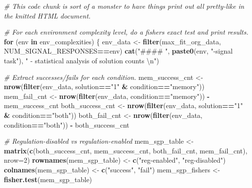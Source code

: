 \documentclass[
]{book}
\newenvironment{Shaded}{\begin{snugshade}}{\end{snugshade}}
\newcommand{\CharTok}[1]{\textcolor[rgb]{0.31,0.60,0.02}{#1}}
\newcommand{\CommentTok}[1]{\textcolor[rgb]{0.56,0.35,0.01}{\textit{#1}}}
\newcommand{\ControlFlowTok}[1]{\textcolor[rgb]{0.13,0.29,0.53}{\textbf{#1}}}
\newcommand{\DataTypeTok}[1]{\textcolor[rgb]{0.13,0.29,0.53}{#1}}
\newcommand{\DecValTok}[1]{\textcolor[rgb]{0.00,0.00,0.81}{#1}}
\newcommand{\KeywordTok}[1]{\textcolor[rgb]{0.13,0.29,0.53}{\textbf{#1}}}
\newcommand{\NormalTok}[1]{#1}
\newcommand{\OperatorTok}[1]{\textcolor[rgb]{0.81,0.36,0.00}{\textbf{#1}}}
\newcommand{\StringTok}[1]{\textcolor[rgb]{0.31,0.60,0.02}{#1}}
\begin{document}
\begin{Shaded}
\begin{Highlighting}[]
\CommentTok{\# This code chunk is sort of a monster to have things print out all pretty{-}like in the knitted HTML document.}

\CommentTok{\# For each environment complexity level, do a fisher\textquotesingle{}s exact test and print results.}
\ControlFlowTok{for}\NormalTok{ (env }\ControlFlowTok{in}\NormalTok{ env\_complexities) \{}
\NormalTok{  env\_data \textless{}{-}}\StringTok{ }\KeywordTok{filter}\NormalTok{(max\_fit\_org\_data, NUM\_SIGNAL\_RESPONSES}\OperatorTok{==}\NormalTok{env)}
  \KeywordTok{cat}\NormalTok{(}\StringTok{"\#\#\#\# "}\NormalTok{, }\KeywordTok{paste0}\NormalTok{(env, }\StringTok{"{-}signal task"}\NormalTok{), }\StringTok{" {-} statistical analysis of solution counts  }\CharTok{\textbackslash{}n}\StringTok{"}\NormalTok{)}

  \CommentTok{\# Extract successes/fails for each condition.}
\NormalTok{  mem\_success\_cnt \textless{}{-}}\StringTok{ }\KeywordTok{nrow}\NormalTok{(}\KeywordTok{filter}\NormalTok{(env\_data, solution}\OperatorTok{==}\StringTok{"1"} \OperatorTok{\&}\StringTok{ }\NormalTok{condition}\OperatorTok{==}\StringTok{"memory"}\NormalTok{))}
\NormalTok{  mem\_fail\_cnt \textless{}{-}}\StringTok{ }\KeywordTok{nrow}\NormalTok{(}\KeywordTok{filter}\NormalTok{(env\_data, condition}\OperatorTok{==}\StringTok{"memory"}\NormalTok{)) }\OperatorTok{{-}}\StringTok{ }\NormalTok{mem\_success\_cnt}
\NormalTok{  both\_success\_cnt \textless{}{-}}\StringTok{ }\KeywordTok{nrow}\NormalTok{(}\KeywordTok{filter}\NormalTok{(env\_data, solution}\OperatorTok{==}\StringTok{"1"} \OperatorTok{\&}\StringTok{ }\NormalTok{condition}\OperatorTok{==}\StringTok{"both"}\NormalTok{))}
\NormalTok{  both\_fail\_cnt \textless{}{-}}\StringTok{ }\KeywordTok{nrow}\NormalTok{(}\KeywordTok{filter}\NormalTok{(env\_data, condition}\OperatorTok{==}\StringTok{"both"}\NormalTok{)) }\OperatorTok{{-}}\StringTok{ }\NormalTok{both\_success\_cnt}

  \CommentTok{\# Regulation{-}disabled vs regulation{-}enabled}
\NormalTok{  mem\_sgp\_table \textless{}{-}}\StringTok{ }\KeywordTok{matrix}\NormalTok{(}\KeywordTok{c}\NormalTok{(both\_success\_cnt,}
\NormalTok{                            mem\_success\_cnt,}
\NormalTok{                            both\_fail\_cnt,}
\NormalTok{                            mem\_fail\_cnt),}
                          \DataTypeTok{nrow=}\DecValTok{2}\NormalTok{)}
  \KeywordTok{rownames}\NormalTok{(mem\_sgp\_table) \textless{}{-}}\StringTok{ }\KeywordTok{c}\NormalTok{(}\StringTok{"reg{-}enabled"}\NormalTok{, }\StringTok{"reg{-}disabled"}\NormalTok{)}
  \KeywordTok{colnames}\NormalTok{(mem\_sgp\_table) \textless{}{-}}\StringTok{ }\KeywordTok{c}\NormalTok{(}\StringTok{"success"}\NormalTok{, }\StringTok{"fail"}\NormalTok{)}
\NormalTok{  mem\_sgp\_fishers \textless{}{-}}\StringTok{ }\KeywordTok{fisher.test}\NormalTok{(mem\_sgp\_table)}


\end{Highlighting}
\end{Shaded}
\end{document}
